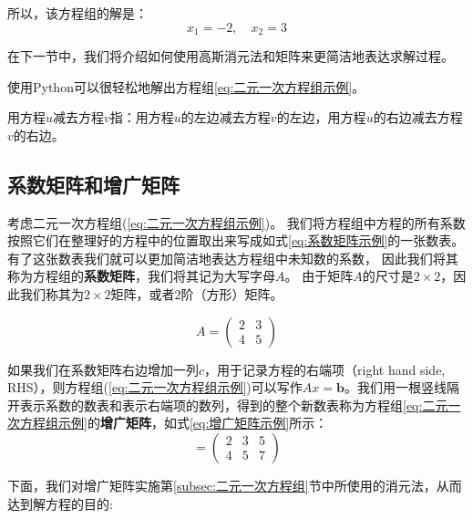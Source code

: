 所以，该方程组的解是：
\[
x_1 = -2, \quad x_2 = 3
\]


在下一节中，我们将介绍如何使用高斯消元法和矩阵来更简洁地表达求解过程。

\vspace{0.3cm}

\noindent 使用Python可以很轻松地解出方程组\ref{eq:二元一次方程组示例}。



\begin{note}
    用方程$u$减去方程$v$指：用方程$u$的左边减去方程$v$的左边，用方程$u$的右边减去方程$v$的右边。
\end{note}

\subsection{系数矩阵和增广矩阵}
\label{subsec:系数矩阵和增广矩阵}

考虑二元一次方程组(\ref{eq:二元一次方程组示例})。
我们将方程组中方程的所有系数按照它们在整理好的方程中的位置取出来写成如式\ref{eq:系数矩阵示例}的一张数表。
有了这张数表我们就可以更加简洁地表达方程组中未知数的系数，
因此我们将其称为方程组的\textcolor{third}{\bf 系数矩阵}，我们将其记为大写字母$A$。
由于矩阵$A$的尺寸是$2\times 2$，因此我们称其为$2\times 2$矩阵，或者$2$阶（方形）矩阵。

\begin{equation}
  A = \left(\begin{array}{ll}
2 & 3 \\
4 & 5
\end{array}\right)
\label{eq:系数矩阵示例}
\end{equation}

如果我们在系数矩阵右边增加一列$c$，用于记录方程的右端项（right hand side, RHS），则方程组(\ref{eq:二元一次方程组示例})可以写作$Ax=\boldsymbol{b}$。我们用一根竖线隔开表示系数的数表和表示右端项的数列，得到的整个新数表称为方程组\ref{eq:二元一次方程组示例}的\textcolor{third}{\bf 增广矩阵}，如式\ref{eq:增广矩阵示例}所示：
\begin{equation}
    [A \mid c]=\left(\begin{array}{cc|c}
2 & 3 & 5 \\
4 & 5 & 7
\end{array}\right)
\label{eq:增广矩阵示例}
\end{equation}

下面，我们对增广矩阵实施第\ref{subsec:二元一次方程组}节中所使用的消元法，从而达到解方程的目的:

